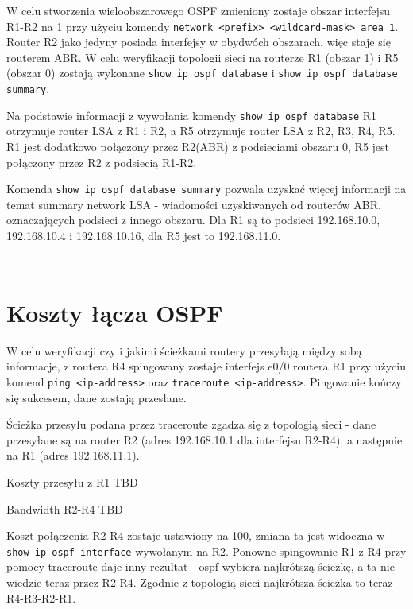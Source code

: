 \documentclass[a4paper,12pt,notitlepage]{article}
\begin{document}
W celu stworzenia wieloobszarowego OSPF zmieniony zostaje obszar interfejsu R1-R2 na 1 przy użyciu komendy  \texttt{network <prefix> <wildcard-mask> area 1}. Router R2 jako jedyny posiada interfejsy w obydwóch obszarach, więc staje się routerem ABR. W celu weryfikacji topologii sieci na routerze R1 (obszar 1) i R5 (obszar 0) zostają wykonane  \texttt{show ip ospf database} i \texttt{show ip ospf database summary}.

Na podstawie informacji z wywołania komendy \texttt{show ip ospf database} R1 otrzymuje router LSA z R1 i R2, a R5 otrzymuje router LSA z R2, R3, R4, R5. R1 jest dodatkowo połączony przez R2(ABR) z podsieciami obszaru 0, R5 jest połączony przez R2 z podsiecią R1-R2. 

Komenda \texttt{show ip ospf database summary} pozwala uzyskać więcej informacji na temat summary network LSA - wiadomości uzyskiwanych od routerów ABR, oznaczających podsieci z innego obszaru. Dla R1 są to podsieci 192.168.10.0, 192.168.10.4 i 192.168.10.16, dla R5 jest to 192.168.11.0.
\inputminted[label=Router R1, firstline=309, lastline=390]{text}{R1.txt}
\inputminted[label=Router R5, firstline=638, lastline=680]{text}{R5.txt}

\section{Koszty łącza OSPF}

W celu weryfikacji czy i jakimi ścieżkami routery przesyłają między sobą informacje, z routera R4 spingowany zostaje interfejs e0/0 routera R1 przy użyciu komend   \texttt{ping <ip-address>} oraz  \texttt{traceroute <ip-address>}. Pingowanie kończy się sukcesem, dane zostają przesłane. 

Ścieżka przesyłu podana przez traceroute zgadza się z topologią sieci - dane przesyłane są na router R2 (adres 192.168.10.1 dla interfejsu R2-R4), a następnie na R1 (adres 192.168.11.1).

Koszty przesyłu z R1 TBD

Bandwidth R2-R4 TBD

Koszt połączenia R2-R4 zostaje ustawiony na 100, zmiana ta jest widoczna w \texttt{show ip ospf interface} wywołanym na R2. Ponowne spingowanie R1 z R4 przy pomocy traceroute daje inny rezultat - ospf wybiera najkrótszą ścieżkę, a ta nie wiedzie teraz przez R2-R4. Zgodnie z topologią sieci najkrótsza ścieżka to teraz R4-R3-R2-R1.
\end{document}
